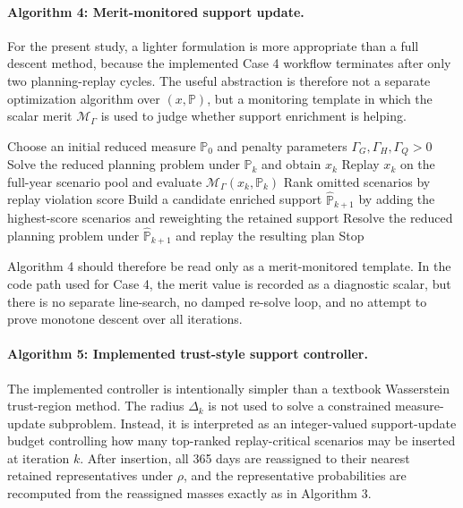 \paragraph{Algorithm 4: Merit-monitored support update.}

For the present study, a lighter formulation is more appropriate than a full descent method, because the implemented Case 4 workflow terminates after only two planning-replay cycles. The useful abstraction is therefore not a separate optimization algorithm over \((x,\mathbb{P})\), but a monitoring template in which the scalar merit \(\mathcal{M}_{\Gamma}\) is used to judge whether support enrichment is helping.

\begin{algorithmic}[1]
\State Choose an initial reduced measure \(\mathbb{P}_0\) and penalty parameters \(\Gamma_G,\Gamma_H,\Gamma_Q>0\)
  \State Solve the reduced planning problem under \(\mathbb{P}_k\) and obtain \(x_k\)
  \State Replay \(x_k\) on the full-year scenario pool and evaluate \(\mathcal{M}_{\Gamma}(x_k,\mathbb{P}_k)\)
  \State Rank omitted scenarios by replay violation score
  \State Build a candidate enriched support \(\widehat{\mathbb{P}}_{k+1}\) by adding the highest-score scenarios and reweighting the retained support
  \State Resolve the reduced planning problem under \(\widehat{\mathbb{P}}_{k+1}\) and replay the resulting plan
    \State Stop
  \EndIf
\EndFor
\end{algorithmic}

Algorithm 4 should therefore be read only as a merit-monitored template. In the code path used for Case 4, the merit value is recorded as a diagnostic scalar, but there is no separate line-search, no damped re-solve loop, and no attempt to prove monotone descent over all iterations.

\paragraph{Algorithm 5: Implemented trust-style support controller.}

The implemented controller is intentionally simpler than a textbook Wasserstein trust-region method. The radius \(\Delta_k\) is not used to solve a constrained measure-update subproblem. Instead, it is interpreted as an integer-valued support-update budget controlling how many top-ranked replay-critical scenarios may be inserted at iteration \(k\). After insertion, all 365 days are reassigned to their nearest retained representatives under \(\rho\), and the representative probabilities are recomputed from the reassigned masses exactly as in Algorithm 3.


